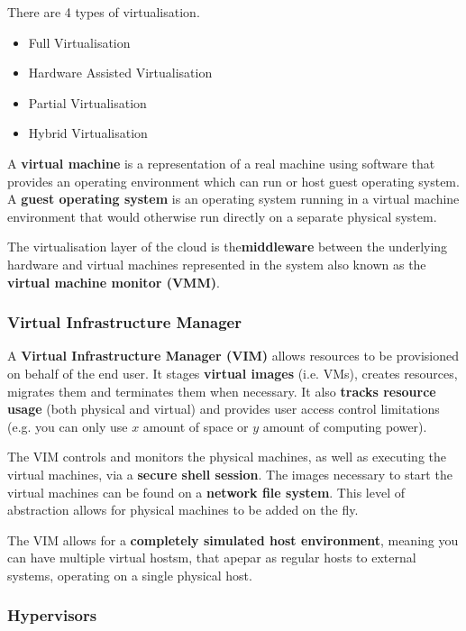 \documentclass{article}
\begin{document}
There are 4 types of virtualisation.
\begin{itemize}
    \item Full Virtualisation
    \item Hardware Assisted Virtualisation
    \item Partial Virtualisation
    \item Hybrid Virtualisation
\end{itemize}

A \textbf{virtual machine} is a representation of a real machine using software that provides an operating environment which can run or host guest operating system. A \textbf{guest operating system} is an operating system running in a virtual machine environment that would otherwise run directly on a separate physical system.

The virtualisation layer of the cloud is the\textbf{middleware} between the underlying hardware and virtual machines represented in the system also known as the \textbf{virtual machine monitor (VMM)}.

\subsubsection{Virtual Infrastructure Manager}

A \textbf{Virtual Infrastructure Manager (VIM)} allows resources to be provisioned on behalf of the end user. It stages \textbf{virtual images} (i.e. VMs), creates resources, migrates them and terminates them when necessary. It also \textbf{tracks resource usage} (both physical and virtual) and provides user access control limitations (e.g. you can only use $x$ amount of space or $y$ amount of computing power).

The VIM controls and monitors the physical machines, as well as executing the virtual machines, via a \textbf{secure shell session}. The images necessary to start the virtual machines can be found on a \textbf{network file system}. This level of abstraction allows for physical machines to be added on the fly.

The VIM allows for a \textbf{completely simulated host environment}, meaning you can have multiple virtual hostsm, that apepar as regular hosts to external systems, operating on a single physical host.

\subsubsection{Hypervisors}
\end{document}
